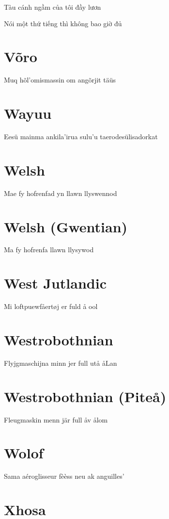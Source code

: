 \documentclass{article}
\begin{document}
Tàu cánh ngầm của tôi đầy lươn

\noindent
Nói một thứ tiếng thì không bao giờ đủ

\section{Võro}

Muq hõl'omismassin om angõrjit täüs

\section{Wayuu}

Eesü mainma ankila'irua sulu'u taerodesülisadorkat

\section{Welsh}

Mae fy hofrenfad yn llawn llyswennod

\section{Welsh (Gwentian)}

Ma fy hofrenfa llawn llysywod

\section{West Jutlandic}

Mi loftpuewfåertøj er fuld å ool

\section{Westrobothnian}

Flyjgmaschijna minn jer full utå åLan

\section{Westrobothnian (Piteå)}

Fleugmaskin menn jär full åv ålom

\section{Wolof}

Sama aéroglisseur fèèss neu ak anguilles'

\section{Xhosa}
\end{document}
